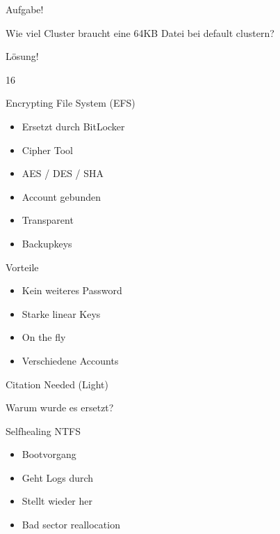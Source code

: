 \documentclass[12pt]{beamer}
\begin{document}
\begin{frame}{Aufgabe!}
\begin{center}
\huge Wie viel Cluster braucht eine 64KB Datei bei default clustern?
\end{center}
\end{frame}

\begin{frame}{Lösung!}
\begin{center}
\huge 16
\end{center}
\end{frame}

\begin{frame}{Encrypting File System (EFS)}
\begin{itemize}
\item Ersetzt durch BitLocker
\item Cipher Tool
\item AES / DES / SHA
\item Account gebunden
\item Transparent
\item Backupkeys
\end{itemize}
\end{frame}

\begin{frame}{Vorteile}
\begin{itemize}
\item Kein weiteres Password
\item Starke linear Keys
\item On the fly
\item Verschiedene Accounts
\end{itemize}
\end{frame}

\begin{frame}{Citation Needed (Light)}
\begin{center}
\huge Warum wurde es ersetzt?
\end{center}
\end{frame}

\begin{frame}{Selfhealing NTFS}
\begin{itemize}
\item Bootvorgang
\item Geht Logs durch
\item Stellt wieder her
\item Bad sector reallocation
\end{itemize}
\end{frame}
\end{document}
